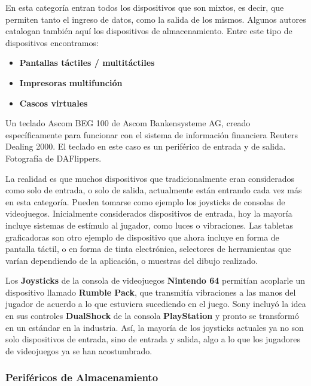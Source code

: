 En esta categoría entran todos los dispositivos que son mixtos, es decir, que
permiten tanto el ingreso de datos, como la salida de los mismos. Algunos autores
catalogan también aquí los dispositivos de almacenamiento.\autocite[p. 246]{laplante_2000}
Entre este tipo de dispositivos encontramos:
\begin{itemize}
    \item \textbf{Pantallas táctiles / multitáctiles}
    \item \textbf{Impresoras multifunción}
    \item \textbf{Cascos virtuales}
\end{itemize}

{Un teclado Ascom BEG 100 de Ascom Bankensysteme AG, creado específicamente para
funcionar con el sistema de información financiera Reuters Dealing 2000. El
teclado en este caso es un periférico de entrada y de salida.}
{Fotografía de DAFlippers.}

La realidad es que muchos dispositivos que tradicionalmente eran
considerados como solo de entrada, o solo de salida, actualmente están entrando
cada vez más en esta categoría. Pueden tomarse como ejemplo los joysticks de
consolas de videojuegos. Inicialmente considerados dispositivos de entrada, hoy
la mayoría incluye sistemas de estímulo al jugador, como luces o vibraciones.
Las tabletas graficadoras son otro ejemplo de dispositivo que ahora incluye
en forma de pantalla táctil, o en forma de tinta electrónica, selectores de
herramientas que varían dependiendo de la aplicación, o muestras del dibujo
realizado.

\begin{knowwhat}
Los \textbf{Joysticks} de la consola de videojuegos \textbf{Nintendo 64}
permitían acoplarle un dispositivo llamado \textbf{Rumble Pack}, que transmitía
vibraciones a las manos del jugador de acuerdo a lo que estuviera sucediendo en
el juego. Sony incluyó la idea en sus controles \textbf{DualShock} de la consola
\textbf{PlayStation} y pronto se transformó en un estándar en la industria. Así,
la mayoría de los joysticks actuales ya no son solo dispositivos de entrada,
sino de entrada y salida, algo a lo que los jugadores de videojuegos ya se han
acostumbrado.
\end{knowwhat}

\subsubsection*{Periféricos de Almacenamiento}

